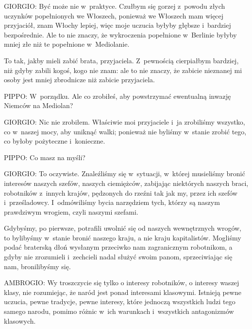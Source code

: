 \documentclass[oneside,polish,11pt,sfheadings]{mwbk}
\begin{document}
 
\noindent GIORGIO: Być może nie w~praktyce. Czułbym się gorzej z~powodu złych uczynków popełnionych we Włoszech, ponieważ we
Włoszech mam więcej przyjaciół, znam Włochy lepiej, więc moje uczucia byłyby głębsze i~bardziej bezpośrednie. Ale to
nie znaczy, że wykroczenia popełnione w~Berlinie byłyby mniej złe niż te popełnione w~Mediolanie. 

 
To tak, jakby mieli zabić brata, przyjaciela. Z~pewnością cierpiałbym bardziej, niż gdyby zabili kogoś, kogo nie znam:
ale to nie znaczy, że zabicie nieznanej mi osoby jest mniej zbrodnicze niż zabicie przyjaciela. 




 
\noindent PIPPO: W~porządku. Ale co zrobiłeś, aby powstrzymać ewentualną inwazję Niemców na Mediolan? 




 
\noindent GIORGIO: Nic nie zrobiłem. Właściwie moi przyjaciele i~ja zrobiliśmy wszystko, co w~naszej mocy, aby uniknąć walki;
ponieważ nie byliśmy w~stanie zrobić tego, co byłoby pożyteczne i~konieczne. 




 
\noindent PIPPO: Co masz na myśli? 




 
\noindent GIORGIO: To oczywiste. Znaleźliśmy się w~sytuacji, w~której musieliśmy bronić interesów naszych szefów, naszych
ciemiężców, zabijając niektórych naszych braci, robotników z~innych krajów, pędzonych do rzeźni tak jak my, przez ich
szefów i~prześladowcy. I~odmówiliśmy bycia narzędziem tych, którzy są naszym prawdziwym wrogiem, czyli naszymi
szefami. 

 
Gdybyśmy, po pierwsze, potrafili uwolnić się od naszych wewnętrznych wrogów, to bylibyśmy w~stanie bronić naszego kraju,
a nie kraju kapitalistów. Mogliśmy podać braterską dłoń wysłanym przeciwko nam zagranicznym robotnikom, a gdyby nie
zrozumieli i~zechcieli nadal służyć swoim panom, sprzeciwiając się nam, bronilibyśmy się. 




 
\noindent AMBROGIO: Wy troszczycie się tylko o interesy robotników, o interesy waszej klasy, nie rozumiejąc, że naród jest ponad
interesami klasowymi. Istnieją pewne uczucia, pewne tradycje, pewne interesy, które jednoczą wszystkich ludzi tego
samego narodu, pomimo różnic w~ich warunkach i~wszystkich antagonizmów klasowych. 
\end{document}
